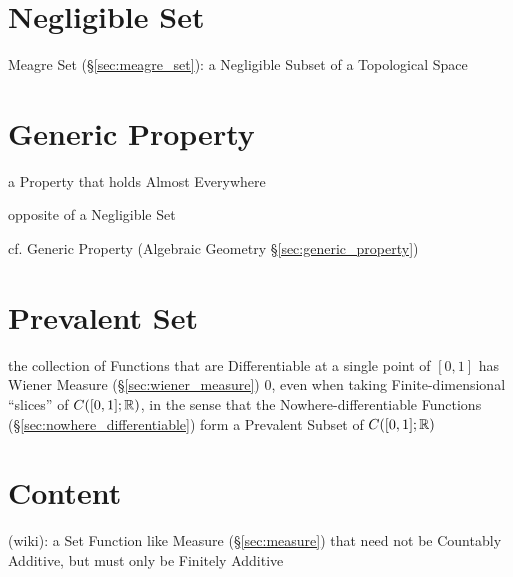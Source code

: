 \section{Negligible Set}\label{sec:negligible_set}

Meagre Set (\S\ref{sec:meagre_set}): a Negligible Subset of a Topological Space



\section{Generic Property}\label{sec:generic_measure_property}

a Property that holds Almost Everywhere

opposite of a Negligible Set

cf. Generic Property (Algebraic Geometry \S\ref{sec:generic_property})



\section{Prevalent Set}\label{sec:prevalent_set}

the collection of Functions that are Differentiable at a single point of
$[0,1]$ has Wiener Measure (\S\ref{sec:wiener_measure}) $0$, even when taking
Finite-dimensional ``slices'' of $C([0,1];\mathbb{R})$, in the sense that the
Nowhere-differentiable Functions (\S\ref{sec:nowhere_differentiable}) form a
Prevalent Subset of $C([0,1]; \mathbb{R})$



\section{Content}\label{sec:content}

(wiki): a Set Function like Measure (\S\ref{sec:measure}) that need not be
Countably Additive, but must only be Finitely Additive
